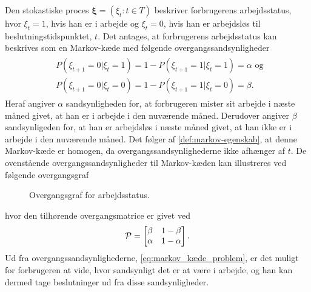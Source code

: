 Den stokastiske proces $\bm \xi= (\xi_t : t \in T)$ beskriver forbrugerens arbejdsstatus, hvor $\xi_t=1$, hvis han er i arbejde og $\xi_t=0$, hvis han er arbejdsløs til beslutningstidspunktet, $t$. Det antages, at forbrugerens arbejdsstatus kan beskrives som en Markov-kæde med følgende overgangssandsynligheder
\begin{align}\label{eq:markov_kæde_problem}
\begin{split}
    &P(\xi_{t+1}=0|\xi_t=1)=1-P(\xi_{t+1}=1|\xi_t=1)=\alpha \text{ og }\\
    &P(\xi_{t+1}=0|\xi_t=0)=1-P(\xi_{t+1}=1|\xi_t=0)=\beta.
    \end{split}
\end{align}
Heraf angiver $\alpha$ sandsynligheden for, at forbrugeren mister sit arbejde i næste måned givet, at han er i arbejde i den nuværende måned. Derudover angiver $\beta$ sandsynligeden for, at han er arbejdsløs i næste måned givet, at han ikke er i arbejde i den nuværende måned. Det følger af \autoref{def:markov-egenskab}, at denne Markov-kæde er homogen, da overgangssandsynlighederne ikke afhænger af $t$. De ovenstående overgangssandsynligheder til Markov-kæden kan illustreres ved følgende overgangsgraf
\begin{figure}[H]
    \centering
    \caption{Overgangsgraf for arbejdsstatus.}
    \label{fig:overgangsgraf_for_arbejdsstatus}
\end{figure}

hvor den tilhørende overgangsmatrice er givet ved
\begin{align*}
    \P=\begin{bmatrix}\beta & 1-\beta\\ \alpha & 1-\alpha\end{bmatrix}.
\end{align*}
Ud fra overgangssandsynlighederne, \eqref{eq:markov_kæde_problem}, er det muligt for forbrugeren at vide, hvor sandsynligt det er at være i arbejde, og han kan dermed tage beslutninger ud fra disse sandsynligheder.

